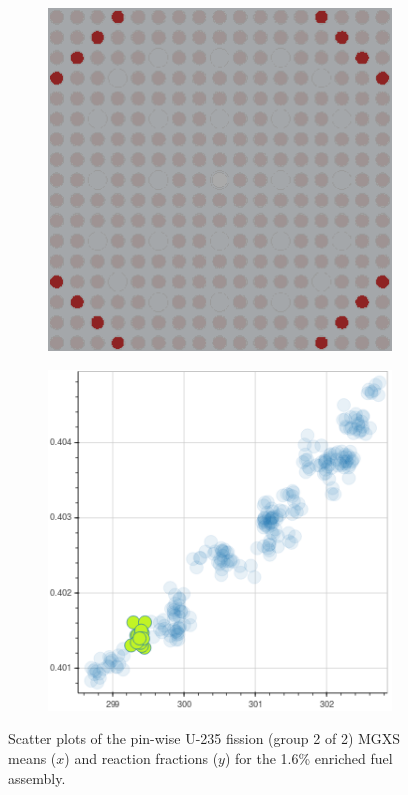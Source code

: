 \begin{figure}[h!]
\begin{subfigure}{0.45\textwidth}
  \caption{}
  \label{fig:chap10-fiss-mean-react-frac-mgxs-2}
\end{subfigure}
\begin{subfigure}{0.45\textwidth}
  \centering
  \includegraphics[width=0.9\linewidth]{figures/unsupervised/features/assm-16/u235-fiss/mean-react-frac/geometry-3}
  \caption{}
  \label{fig:chap10-fiss-mean-react-frac-geom-3}
\end{subfigure}%
\begin{subfigure}{0.45\textwidth}
  \centering
  \includegraphics[width=0.9\linewidth]{figures/unsupervised/features/assm-16/u235-fiss/mean-react-frac/mgxs-3}
  \caption{}
  \label{fig:chap10-fiss-mean-react-frac-mgxs-3}
\end{subfigure}
\caption[Clustering of U-235 fission MGXS reaction fractions]{Scatter plots of the pin-wise U-235 fission (group 2 of 2) \ac{MGXS} means ($x$) and reaction fractions ($y$) for the 1.6\% enriched fuel assembly.}
\label{fig:chap10-fiss-mean-react-frac}
\end{figure}

